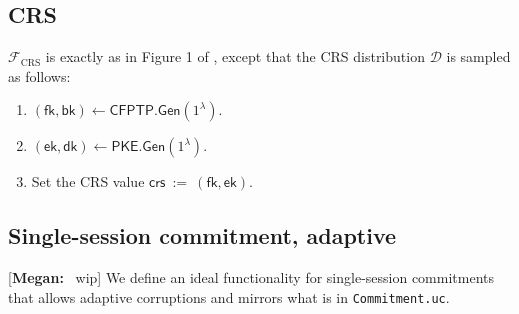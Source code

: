 \documentclass[11pt,letterpaper]{article}
\newcommand{\authnote}[2]{[{\color{red}\textbf{#1:}}~{\color{blue} #2}]}
\newcommand{\authnote}[2]{}
\newcommand{\megan}[1]{\authnote{Megan}{#1}}
\theoremstyle{plain} %
\theoremstyle{definition} %
\theoremstyle{remark} %
\newcommand{\eqdef}{\ {:=} \ }
\newcommand{\SecParam}{\lambda}
\newcommand{\PKE}{\mathsf{PKE}}
\newcommand{\Gen}{\mathsf{Gen}}
\newcommand{\EncKey}{\mathsf{ek}}
\newcommand{\DecKey}{\mathsf{dk}}
\newcommand{\CFPTP}{\mathsf{CFPTP}}
\newcommand{\ForwKey}{\mathsf{fk}}
\newcommand{\BackKey}{\mathsf{bk}}
\newcommand{\IF}{\mathcal{F}} %
\newcommand{\IFCrs}{\IF_{\mathrm{CRS}}}
\newcommand{\CrsDistr}{\mathcal{D}}
\newcommand{\crs}{\mathsf{crs}}
\newcommand{\File}[1]{\texttt{#1}}
\begin{document}
\subsection{CRS}
\label{sec:ideal-func-crs}
$\IFCrs$ is exactly as in Figure 1 of \cite{CanettiF01}, except that the CRS distribution $\CrsDistr$ is sampled as follows:
\begin{enumerate}[nolistsep]
	\item $(\ForwKey,\BackKey) \gets \CFPTP.\Gen(1^{\SecParam})$.
	\item $(\EncKey,\DecKey) \gets \PKE.\Gen(1^{\SecParam})$.
	\item Set the CRS value $\crs \eqdef (\ForwKey, \EncKey)$.
\end{enumerate}

\subsection{Single-session commitment, adaptive}
\label{sec:ideal-func-com}

\megan{wip}
We define an ideal functionality for single-session commitments that allows adaptive corruptions and mirrors what is in \File{Commitment.uc}.
\newcommand{\EnvCommitReqMsg}{\mathsf{EnvCommitReq}}
\newcommand{\IFCommitReqMsg}{\mathsf{IFCommitReq}}
\newcommand{\SimCommitterCorruptionStatusMsg}{\mathsf{CommitterCorruptionStatus}}
\newcommand{\CommitterBitMsg}{\mathsf{CommitterBit}}
\newcommand{\CommitterCorruptedBit}{\mathsf{corrupted}}
\newcommand{\CommitOkMsg}{\mathsf{CommitOk}}
\end{document}

